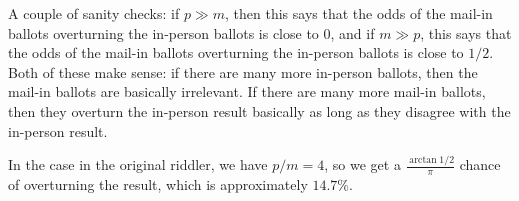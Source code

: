 \documentclass[11pt]{article}
\theoremstyle{definition}
\begin{document}
A couple of sanity checks: if $p \gg m$, then this says that the odds of the mail-in ballots overturning the in-person ballots is close to $0$, and if $m \gg p$, this says that the odds of the mail-in ballots overturning the in-person ballots is close to $1/2$.  Both of these make sense: if there are many more in-person ballots, then the mail-in ballots are basically irrelevant.  If there are many more mail-in ballots, then they overturn the in-person result basically as long as they disagree with the in-person result.

In the case in the original riddler, we have $p/m = 4$, so we get a $\frac{\arctan{1/2}}{\pi}$ chance of overturning the result, which is approximately $14.7\%$.
\end{document}
